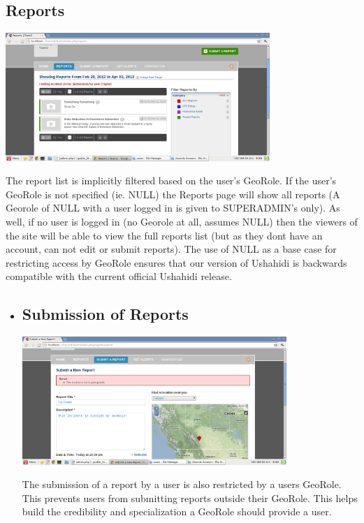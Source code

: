 \documentclass{article}
\begin{document}
\subsection{Reports} 
\begin{minipage}{\linewidth}
  \centering
  \includegraphics[width=100mm]{reports_list.png}
\end{minipage}
The report list is implicitly filtered based on the user's GeoRole. If the user's GeoRole is not specified (ie. NULL) the Reports page will show all reports (A Georole of NULL with a user logged in is given to SUPERADMIN's only).  As well, if no user is logged in (no Georole at all, assumes NULL)  then the viewers of the site will be able to view the full reports list (but as they dont have an account, can not edit or submit reports).  The use of NULL as a base case for restricting access by GeoRole ensures that our version of Ushahidi is backwards compatible with the current official Ushahidi release.
\begin{itemize}
\item \subsection{Submission of Reports}
\begin{minipage}{\linewidth}
  \centering
  \includegraphics[width=100mm]{submit_report_outside_georole_error.png}
\end{minipage}
The submission of a report by a user is also restricted by a users GeoRole.  This prevents users from submitting reports outside their GeoRole.  This helps build the credibility and specialization a GeoRole should provide a user.
\end{itemize}
\end{document}
